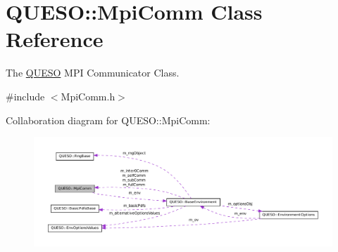 \hypertarget{class_q_u_e_s_o_1_1_mpi_comm}{\section{Q\-U\-E\-S\-O\-:\-:Mpi\-Comm Class Reference}
\label{class_q_u_e_s_o_1_1_mpi_comm}
}


The \hyperlink{namespace_q_u_e_s_o}{Q\-U\-E\-S\-O} M\-P\-I Communicator Class.  




{\ttfamily \#include $<$Mpi\-Comm.\-h$>$}



Collaboration diagram for Q\-U\-E\-S\-O\-:\-:Mpi\-Comm\-:
\nopagebreak
\begin{figure}[H]
\begin{center}
\leavevmode
\includegraphics[width=350pt]{class_q_u_e_s_o_1_1_mpi_comm__coll__graph}
\end{center}
\end{figure}
